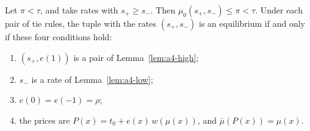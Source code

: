 \begin{lemma}\label{lem:a4-product}
Let \(\pi<\tau\), and take rates with \(s_+\ge s_-\). Then \(\mu_0(s_+,s_-)\le\pi<\tau\). Under each pair of tie rules,
the tuple with the rates \((s_+,s_-)\) is an equilibrium if and only if these four conditions hold:
\begin{enumerate}[label=(\roman*),leftmargin=2.5em]
\item \((s_+,e(1))\) is a pair of Lemma~\ref{lem:a4-high};
\item \(s_-\) is a rate of Lemma~\ref{lem:a4-low};
\item \(e(0)=e(-1)=\rho\);
\item the prices are \(P(x)=t_0+e(x)\,w(\mu(x))\), and \(\bar\mu(P(x))=\mu(x)\).
\end{enumerate}
\end{lemma}

